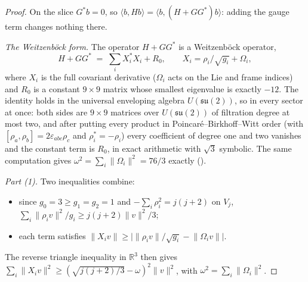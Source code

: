 \documentclass[11pt]{article}
\theoremstyle{definition}
\theoremstyle{remark}
\newcommand{\RR}{\mathbb{R}}
\newcommand{\norm}[1]{\lVert #1\rVert}
\begin{document}
\begin{proof}
On the slice $G^*b=0$, so $\langle b,Hb\rangle=\langle b,(H+GG^*)b\rangle$: adding the gauge term
changes nothing there.

\emph{The Weitzenb\"ock form.} The operator $H+GG^*$ is a Weitzenb\"ock operator,
\[
  H+GG^* \;=\; \sum_i X_i^*X_i + R_0,\qquad X_i=\rho_i/\sqrt{g_i}+\Omega_i,
\]
where $X_i$ is the full covariant derivative ($\Omega_i$ acts on the Lie and frame indices) and $R_0$
is a constant $9\times9$ matrix whose smallest eigenvalue is exactly $-12$. The identity holds in
the universal enveloping algebra $U(\mathfrak{su}(2))$, so in every sector at once: both sides are
$9\times9$ matrices over $U(\mathfrak{su}(2))$ of filtration degree at most two, and after putting
every product in Poincar\'e--Birkhoff--Witt order (with $[\rho_a,\rho_b]=2\varepsilon_{abc}\rho_c$
and $\rho_i^*=-\rho_i$) every coefficient of degree one and two vanishes and the constant term is
$R_0$, in exact arithmetic with $\sqrt3$ symbolic. The same computation gives
$\omega^2=\sum_i\norm{\Omega_i}^2=76/3$ exactly
().

\emph{Part (1).} Two inequalities combine:
\begin{itemize}
  \item since $g_0=3\ge g_1=g_2=1$ and $-\sum_i\rho_i^2=j(j+2)$ on $V_j$,
    $\sum_i\norm{\rho_iv}^2/g_i\ge j(j+2)\norm v^2/3$;
  \item each term satisfies $\norm{X_iv}\ge\bigl|\norm{\rho_iv}/\sqrt{g_i}-\norm{\Omega_iv}\bigr|$.
\end{itemize}
The reverse triangle inequality in $\RR^3$ then gives
$\sum_i\norm{X_iv}^2\ge(\sqrt{j(j+2)/3}-\omega)^2\norm v^2$, with $\omega^2=\sum_i\norm{\Omega_i}^2$.


\end{proof}
\end{document}

